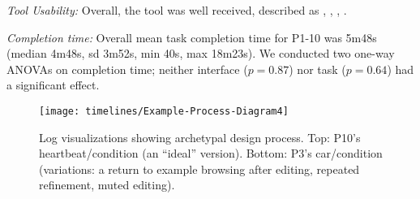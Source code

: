 %


\emph{Tool Usability:} Overall, the tool was well received, described as , , %
, .


\emph{Completion time:}
Overall mean task completion time for P1-10 was 5m48s (median 4m48s, sd 3m52s, min 40s, max 18m23s).
We conducted two one-way ANOVAs on  completion time;
neither interface ($p=0.87$) nor task ($p=0.64$) had a significant effect. %


\begin{figure}[tb]
    \centering  
    \texttt{[image: timelines/Example-Process-Diagram4]}
    \caption{Log visualizations showing archetypal design process. Top: P10's heartbeat/\vis condition (an ``ideal'' version). Bottom: P3's car/\hi condition (variations: a return to example browsing after editing, repeated refinement, muted editing).} 
    \label{fig:archetype}
\end{figure}



